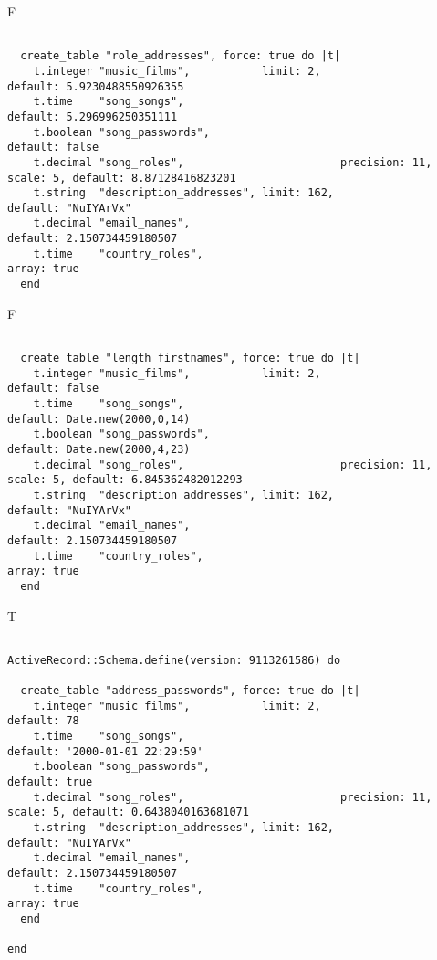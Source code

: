 F
\begin{verbatim}

  create_table "role_addresses", force: true do |t|
    t.integer "music_films",           limit: 2,                            default: 5.9230488550926355
    t.time    "song_songs",                                                 default: 5.296996250351111
    t.boolean "song_passwords",                                             default: false
    t.decimal "song_roles",                        precision: 11, scale: 5, default: 8.87128416823201
    t.string  "description_addresses", limit: 162,                          default: "NuIYArVx"
    t.decimal "email_names",                                                default: 2.150734459180507
    t.time    "country_roles",                                                                              array: true
  end

\end{verbatim}

F
\begin{verbatim}

  create_table "length_firstnames", force: true do |t|
    t.integer "music_films",           limit: 2,                            default: false
    t.time    "song_songs",                                                 default: Date.new(2000,0,14)
    t.boolean "song_passwords",                                             default: Date.new(2000,4,23)
    t.decimal "song_roles",                        precision: 11, scale: 5, default: 6.845362482012293
    t.string  "description_addresses", limit: 162,                          default: "NuIYArVx"
    t.decimal "email_names",                                                default: 2.150734459180507
    t.time    "country_roles",                                                                              array: true
  end

\end{verbatim}

T
\begin{verbatim}

ActiveRecord::Schema.define(version: 9113261586) do

  create_table "address_passwords", force: true do |t|
    t.integer "music_films",           limit: 2,                            default: 78
    t.time    "song_songs",                                                 default: '2000-01-01 22:29:59'
    t.boolean "song_passwords",                                             default: true
    t.decimal "song_roles",                        precision: 11, scale: 5, default: 0.6438040163681071
    t.string  "description_addresses", limit: 162,                          default: "NuIYArVx"
    t.decimal "email_names",                                                default: 2.150734459180507
    t.time    "country_roles",                                                                              array: true
  end

end
\end{verbatim}

